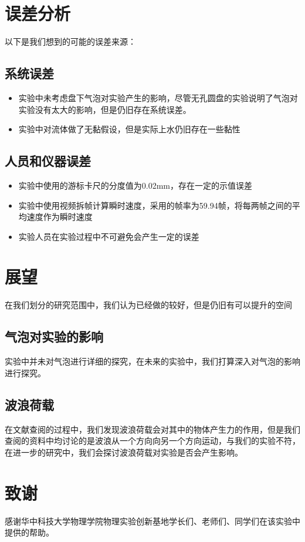 \documentclass[UTF8]{gapd}
\begin{document}
\section{误差分析}
以下是我们想到的可能的误差来源：
\subsection{系统误差}
\begin{itemize}
    \item 实验中未考虑盘下气泡对实验产生的影响，尽管无孔圆盘的实验说明了气泡对实验没有太大的影响，但是仍旧存在系统误差。
    \item 实验中对流体做了无黏假设，但是实际上水仍旧存在一些黏性
\end{itemize}
\subsection{人员和仪器误差}
\begin{itemize}
    \item 实验中使用的游标卡尺的分度值为0.02mm，存在一定的示值误差
    \item 实验中使用视频拆帧计算瞬时速度，采用的帧率为59.94帧，将每两帧之间的平均速度作为瞬时速度
    \item 实验人员在实验过程中不可避免会产生一定的误差
\end{itemize}

\section{展望}
在我们划分的研究范围中，我们认为已经做的较好，但是仍旧有可以提升的空间
\subsection{气泡对实验的影响}
实验中并未对气泡进行详细的探究，在未来的实验中，我们打算深入对气泡的影响进行探究。
\subsection{波浪荷载}
在文献查阅的过程中，我们发现波浪荷载会对其中的物体产生力的作用，但是我们查阅的资料中均讨论的是波浪从一个方向向另一个方向运动，与我们的实验不符，在进一步的研究中，我们会探讨波浪荷载对实验是否会产生影响。
\section*{致谢}
感谢华中科技大学物理学院物理实验创新基地学长们、老师们、同学们在该实验中提供的帮助。
\end{document}
